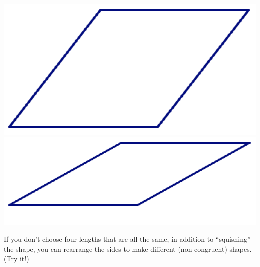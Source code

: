 \documentclass[12pt, reqno]{amsart}
\theoremstyle{remark}
\theoremstyle{definition}
\numberwithin{equation}{section}  %
\begin{document}
\begin{center}
\bigskip
\includegraphics[scale = .45]{rhomb2}
\qquad
\includegraphics[scale = .45]{rhomb3}
\end{center}

If you don't choose four lengths that are all the same, in addition to ``squishing'' the shape, you can rearrange the sides to make different (non-congruent) shapes.  (Try it!)
\end{document}
